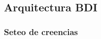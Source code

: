 \subsection{Arquitectura BDI} 
 \label{sub:arquitectura_bdi}

 
  
\subsubsection{Seteo de creencias}
 \label{subsub:seteo_de_creencias}
  
  
  
